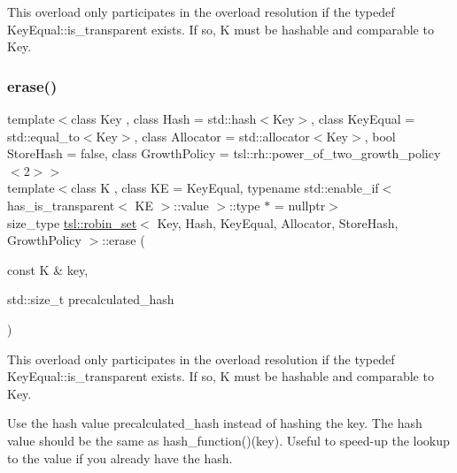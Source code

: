 This overload only participates in the overload resolution if the typedef Key\+Equal\+::is\+\_\+transparent exists. If so, K must be hashable and comparable to Key. \mbox{\label{classtsl_1_1robin__set_ac32644a82963c42443757a3a9f7b94d2}} 
\subsubsection{\texorpdfstring{erase()}{erase()}\hspace{0.1cm}{\footnotesize\ttfamily [3/3]}}
{\footnotesize\ttfamily template$<$class Key , class Hash  = std\+::hash$<$\+Key$>$, class Key\+Equal  = std\+::equal\+\_\+to$<$\+Key$>$, class Allocator  = std\+::allocator$<$\+Key$>$, bool Store\+Hash = false, class Growth\+Policy  = tsl\+::rh\+::power\+\_\+of\+\_\+two\+\_\+growth\+\_\+policy$<$2$>$$>$ \\
template$<$class K , class KE  = Key\+Equal, typename std\+::enable\+\_\+if$<$ has\+\_\+is\+\_\+transparent$<$ K\+E $>$\+::value $>$\+::type $\ast$  = nullptr$>$ \\
size\+\_\+type \mbox{\hyperlink{classtsl_1_1robin__set}{tsl\+::robin\+\_\+set}}$<$ Key, Hash, Key\+Equal, Allocator, Store\+Hash, Growth\+Policy $>$\+::erase (\begin{DoxyParamCaption}\item[{const K \&}]{key,  }\item[{std\+::size\+\_\+t}]{precalculated\+\_\+hash }\end{DoxyParamCaption})\hspace{0.3cm}{\ttfamily [inline]}}





This overload only participates in the overload resolution if the typedef Key\+Equal\+::is\+\_\+transparent exists. If so, K must be hashable and comparable to Key.

Use the hash value \textquotesingle{}precalculated\+\_\+hash\textquotesingle{} instead of hashing the key. The hash value should be the same as hash\+\_\+function()(key). Useful to speed-\/up the lookup to the value if you already have the hash. \mbox{\label{classtsl_1_1robin__set_a764ae0fbf914909a8d7810b7a95fb3c1}} 
